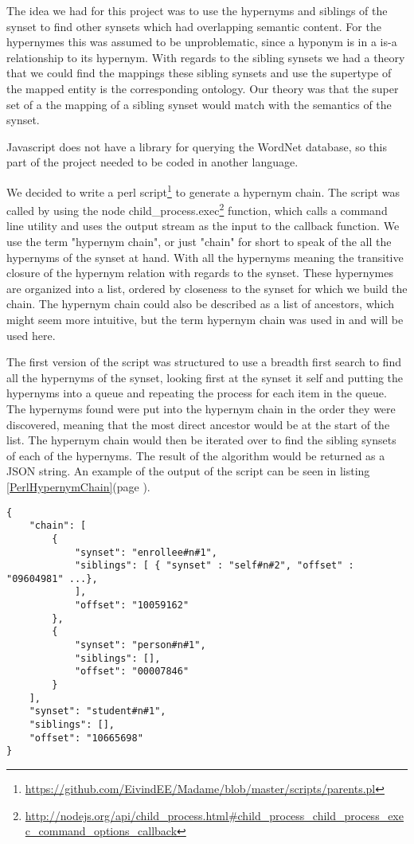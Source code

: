 The idea we had for this project was to use the hypernyms and siblings of the synset to find other synsets
which had overlapping semantic content.
For the hypernymes this was assumed to be unproblematic, since a hyponym is in a is-a relationship to its hypernym.
With regards to the sibling synsets we had a theory that we could find the mappings these sibling synsets
and use the supertype of the mapped entity is the corresponding ontology.
Our theory was that the super set of a the mapping of a sibling synset would match with the semantics of the synset.

Javascript does not have a library for 	querying the WordNet database,
so this part of the project needed to be coded in another language.

We decided to write a perl script\footnote{\url{https://github.com/EivindEE/Madame/blob/master/scripts/parents.pl}} to generate a hypernym chain.
The script was called by using the node
child\_process.exec\footnote{\url{http://nodejs.org/api/child\_process.html\#child\_process\_child\_process\_exec\_command\_options\_callback}}
function, which calls a command line utility and uses the output stream as the input to the callback function.
We use the term "hypernym chain", or just "chain" for short to speak of the all the hypernyms of the synset at hand.
With all the hypernyms meaning  the transitive closure of the hypernym relation with regards to the synset.
These hypernymes are organized into a list, ordered by closeness to the synset for which we build the chain.
The hypernym chain could also be described as a list of ancestors,
which might seem more intuitive, but the term hypernym chain was used in \citet{Veres2011} and will be used here.

The first version of the script was structured to use a breadth first search to find all the hypernyms of the synset,
looking first at the synset it self and putting the hypernyms into a queue and repeating the process for each item in the queue.
The hypernyms found were put into the hypernym chain in the order they were discovered,
meaning that the most direct ancestor would be at the start of the list.
The hypernym chain would then be iterated over to find the sibling synsets of each of the hypernyms.
The result of the algorithm would be returned as a JSON string.
An example of the output of the script can be seen in listing \ref{PerlHypernymChain}(page \pageref{PerlHypernymChain}).

\begin{lstlisting}[label=PerlHypernymChain, caption={Excerpt from the hypernym chain for student\#n\#1}]
{
	"chain": [
		{
			"synset": "enrollee#n#1",
			"siblings": [ { "synset" : "self#n#2", "offset" : "09604981" ...},
			],
			"offset": "10059162"
		},
		{
			"synset": "person#n#1",
			"siblings": [],
			"offset": "00007846"
		}
	],
	"synset": "student#n#1",
	"siblings": [],
	"offset": "10665698"
}
\end{lstlisting}

